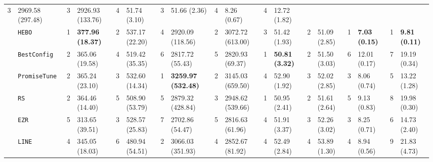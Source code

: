 \begin{tabular}{clllllllllllllllll}
  3 &
  \multicolumn{1}{l|}{2969.58 (297.48)} &
  3 &
  \multicolumn{1}{l|}{2926.93 (133.76)} &
  4 &
  \multicolumn{1}{l|}{51.74 (3.10)} &
  3 &
  \multicolumn{1}{l|}{51.66 (2.36)} &
  4 &
  \multicolumn{1}{l|}{8.26 (0.67)} &
  4 &
  12.72 (1.82) \\
\multicolumn{1}{c|}{} &
  \multicolumn{1}{l|}{\texttt{HEBO}} &
  \cellcolor{yellow!25}1 &
  \multicolumn{1}{l|}{\cellcolor{yellow!25}\textbf{377.96 (18.37)}} &
  2 &
  \multicolumn{1}{l|}{537.17 (22.20)} &
  4 &
  \multicolumn{1}{l|}{2920.09 (118.56)} &
  2 &
  \multicolumn{1}{l|}{3072.72 (613.00)} &
  3 &
  \multicolumn{1}{l|}{51.42 (1.93)} &
  2 &
  \multicolumn{1}{l|}{51.09 (2.85)} &
  \cellcolor{yellow!25}1 &
  \multicolumn{1}{l|}{\cellcolor{yellow!25}\textbf{7.03 (0.15)}} &
  \cellcolor{yellow!25}1 &
  \cellcolor{yellow!25}\textbf{9.81 (0.11)} \\
\multicolumn{1}{c|}{} &
  \multicolumn{1}{l|}{\texttt{BestConfig}} &
  2 &
  \multicolumn{1}{l|}{365.06 (19.58)} &
  4 &
  \multicolumn{1}{l|}{519.42 (35.35)} &
  6 &
  \multicolumn{1}{l|}{2817.72 (55.43)} &
  5 &
  \multicolumn{1}{l|}{2820.93 (69.37)} &
  \cellcolor{yellow!25}1 &
  \multicolumn{1}{l|}{\cellcolor{yellow!25}\textbf{50.81 (3.32)}} &
  2 &
  \multicolumn{1}{l|}{51.50 (3.03)} &
  6 &
  \multicolumn{1}{l|}{12.01 (0.17)} &
  7 &
  19.19 (0.34) \\
\multicolumn{1}{c|}{} &
  \multicolumn{1}{l|}{\texttt{PromiseTune}} &
  2 &
  \multicolumn{1}{l|}{365.24 (23.10)} &
  3 &
  \multicolumn{1}{l|}{532.60 (14.34)} &
  \cellcolor{yellow!25}1 &
  \multicolumn{1}{l|}{\cellcolor{yellow!25}\textbf{3259.97 (532.48)}} &
  2 &
  \multicolumn{1}{l|}{3145.03 (659.50)} &
  4 &
  \multicolumn{1}{l|}{52.90 (1.92)} &
  3 &
  \multicolumn{1}{l|}{52.02 (2.85)} &
  3 &
  \multicolumn{1}{l|}{8.06 (0.74)} &
  5 &
  13.22 (1.28) \\
\multicolumn{1}{c|}{} &
  \multicolumn{1}{l|}{\texttt{RS}} &
  2 &
  \multicolumn{1}{l|}{364.46 (14.40)} &
  5 &
  \multicolumn{1}{l|}{508.90 (53.79)} &
  5 &
  \multicolumn{1}{l|}{2879.32 (428.84)} &
  3 &
  \multicolumn{1}{l|}{2948.62 (539.66)} &
  \cellcolor{yellow!25}1 &
  \multicolumn{1}{l|}{\cellcolor{yellow!25}50.95 (2.41)} &
  2 &
  \multicolumn{1}{l|}{51.61 (2.64)} &
  5 &
  \multicolumn{1}{l|}{9.13 (0.83)} &
  8 &
  19.98 (0.30) \\
\multicolumn{1}{c|}{} &
  \multicolumn{1}{l|}{\texttt{EZR}} &
  5 &
  \multicolumn{1}{l|}{313.65 (39.51)} &
  3 &
  \multicolumn{1}{l|}{528.57 (25.83)} &
  7 &
  \multicolumn{1}{l|}{2702.86 (54.47)} &
  5 &
  \multicolumn{1}{l|}{2816.63 (61.96)} &
  4 &
  \multicolumn{1}{l|}{51.91 (3.37)} &
  3 &
  \multicolumn{1}{l|}{52.26 (3.02)} &
  3 &
  \multicolumn{1}{l|}{8.25 (0.71)} &
  6 &
  14.73 (2.40) \\
\multicolumn{1}{c|}{} &
  \multicolumn{1}{l|}{\texttt{LINE}} &
  4 &
  \multicolumn{1}{l|}{345.05 (18.03)} &
  6 &
  \multicolumn{1}{l|}{480.94 (54.51)} &
  2 &
  \multicolumn{1}{l|}{3066.03 (351.93)} &
  4 &
  \multicolumn{1}{l|}{2852.67 (81.92)} &
  4 &
  \multicolumn{1}{l|}{52.49 (2.84)} &
  4 &
  \multicolumn{1}{l|}{53.89 (1.30)} &
  4 &
  \multicolumn{1}{l|}{8.94 (0.56)} &
  9 &
  21.83 (4.73) \\
\hline
\end{tabular}